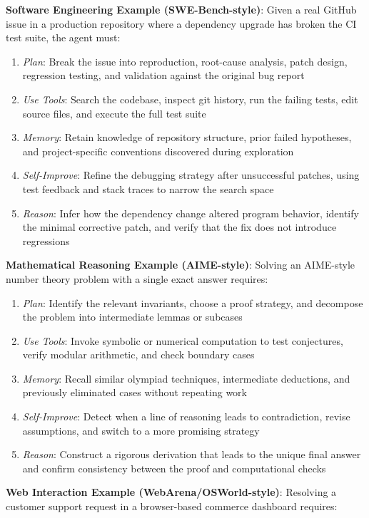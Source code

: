 \textbf{Software Engineering Example (SWE-Bench-style)}: Given a real GitHub issue in a production repository where a dependency upgrade has broken the CI test suite, the agent must:
\begin{enumerate}
    \item \textit{Plan}: Break the issue into reproduction, root-cause analysis, patch design, regression testing, and validation against the original bug report
    \item \textit{Use Tools}: Search the codebase, inspect git history, run the failing tests, edit source files, and execute the full test suite
    \item \textit{Memory}: Retain knowledge of repository structure, prior failed hypotheses, and project-specific conventions discovered during exploration
    \item \textit{Self-Improve}: Refine the debugging strategy after unsuccessful patches, using test feedback and stack traces to narrow the search space
    \item \textit{Reason}: Infer how the dependency change altered program behavior, identify the minimal corrective patch, and verify that the fix does not introduce regressions

\end{enumerate}
\textbf{Mathematical Reasoning Example (AIME-style)}: Solving an AIME-style number theory problem with a single exact answer requires:
\begin{enumerate}
    \item \textit{Plan}: Identify the relevant invariants, choose a proof strategy, and decompose the problem into intermediate lemmas or subcases
    \item \textit{Use Tools}: Invoke symbolic or numerical computation to test conjectures, verify modular arithmetic, and check boundary cases
    \item \textit{Memory}: Recall similar olympiad techniques, intermediate deductions, and previously eliminated cases without repeating work
    \item \textit{Self-Improve}: Detect when a line of reasoning leads to contradiction, revise assumptions, and switch to a more promising strategy
    \item \textit{Reason}: Construct a rigorous derivation that leads to the unique final answer and confirm consistency between the proof and computational checks

\end{enumerate}
\textbf{Web Interaction Example (WebArena/OSWorld-style)}: Resolving a customer support request in a browser-based commerce dashboard requires:
